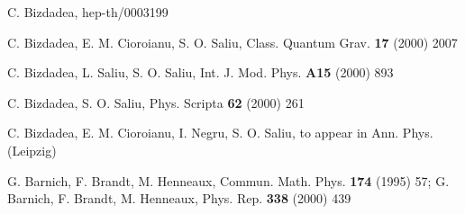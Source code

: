 \documentclass[a4paper,12pt]{article}
\begin{document}
\begin{thebibliography}{99}
  C. Bizdadea, hep-th/0003199

  C. Bizdadea, E. M. Cioroianu,
S. O. Saliu, Class. Quantum
Grav. \textbf{17} (2000) 2007

  C. Bizdadea, L. Saliu,
S. O. Saliu, Int. J. Mod. Phys. \textbf{%
A15} (2000) 893

  C. Bizdadea, S. O. Saliu,
Phys. Scripta \textbf{62} (2000) 261

  C. Bizdadea, E. M. Cioroianu,
I. Negru, S. O. Saliu, to
appear in Ann. Phys. (Leipzig)

  G. Barnich, F. Brandt, M.
Henneaux, Commun. Math. Phys.
\textbf{174} (1995) 57; G. Barnich, F.
Brandt, M. Henneaux, Phys. Rep.
\textbf{338} (2000) 439
\end{thebibliography}
\end{document}
